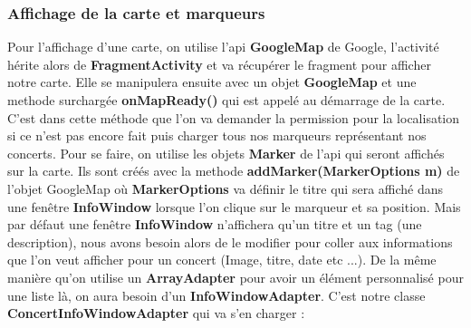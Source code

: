 \documentclass{article}
\begin{document}
\subsubsection{Affichage de la carte et marqueurs}

Pour l'affichage d'une carte, on utilise l'api \textbf{GoogleMap} de Google, l'activité hérite alors de \textbf{FragmentActivity} et va récupérer le fragment pour afficher notre carte. Elle se manipulera ensuite avec un objet \textbf{GoogleMap} et une methode surchargée \textbf{onMapReady()} qui est appelé au démarrage de la carte. 
C'est dans cette méthode que l'on va demander la permission pour la localisation si ce n'est pas encore fait puis charger tous nos marqueurs représentant nos concerts. 
Pour se faire, on utilise les objets \textbf{Marker} de l'api qui seront affichés sur la carte. Ils sont créés avec la methode \textbf{addMarker(MarkerOptions m)} de l'objet GoogleMap où \textbf{MarkerOptions} va définir le titre qui sera affiché dans une fenêtre \textbf{InfoWindow} lorsque l'on clique sur le marqueur et sa position.
Mais par défaut une fenêtre \textbf{InfoWindow} n'affichera qu'un titre et un tag (une description), nous avons besoin alors de le modifier pour coller aux informations que l'on veut afficher pour un concert (Image, titre, date etc ...).
De la même manière qu'on utilise un \textbf{ArrayAdapter} pour avoir un élément personnalisé pour une liste là, on aura besoin d'un \textbf{InfoWindowAdapter}.
\medskip
C'est notre classe \textbf{ConcertInfoWindowAdapter} qui va s'en charger :
\end{document}

